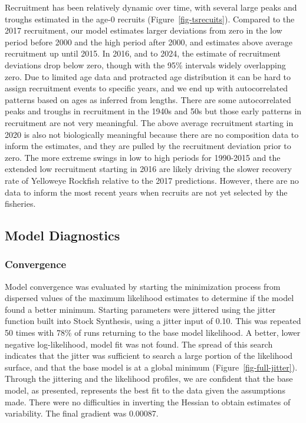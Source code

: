 \documentclass[
]{scrartcl}
\begin{document}
Recruitment has been relatively dynamic over time, with several large
peaks and troughs estimated in the age-0 recruits
(Figure~\ref{fig-tsrecuits}). Compared to the 2017 recruitment, our
model estimates larger deviations from zero in the low period before
2000 and the high period after 2000, and estimates above average
recruitment up until 2015. In 2016, and to 2024, the estimate of
recruitment deviations drop below zero, though with the 95\% intervals
widely overlapping zero. Due to limited age data and protracted age
distribution it can be hard to assign recruitment events to specific
years, and we end up with autocorrelated patterns based on ages as
inferred from lengths. There are some autocorrelated peaks and troughs
in recruitment in the 1940s and 50s but those early patterns in
recruitment are not very meaningful. The above average recruitment
starting in 2020 is also not biologically meaningful because there are
no composition data to inform the estimates, and they are pulled by the
recruitment deviation prior to zero. The more extreme swings in low to
high periods for 1990-2015 and the extended low recruitment starting in
2016 are likely driving the slower recovery rate of Yelloweye Rockfish
relative to the 2017 predictions. However, there are no data to inform
the most recent years when recruits are not yet selected by the
fisheries.

\subsection{Model Diagnostics}\label{model-diagnostics}

\subsubsection{Convergence}\label{convergence}

Model convergence was evaluated by starting the minimization process
from dispersed values of the maximum likelihood estimates to determine
if the model found a better minimum. Starting parameters were jittered
using the jitter function built into Stock Synthesis, using a jitter
input of 0.10. This was repeated 50 times with 78\% of runs returning to
the base model likelihood. A better, lower negative log-likelihood,
model fit was not found. The spread of this search indicates that the
jitter was sufficient to search a large portion of the likelihood
surface, and that the base model is at a global minimum
(Figure~\ref{fig-full-jitter}). Through the jittering and the likelihood
profiles, we are confident that the base model, as presented, represents
the best fit to the data given the assumptions made. There were no
difficulties in inverting the Hessian to obtain estimates of
variability. The final gradient was 0.00087.
\end{document}
